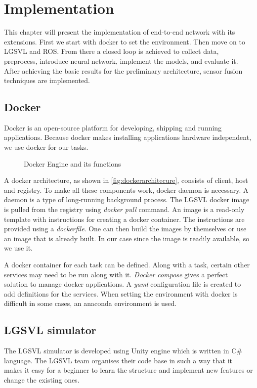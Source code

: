 \chapter{Implementation}
\label{chapter:implementation}
This chapter will present the implementation of end-to-end network with its extensions.
First we start with docker to set the environment. Then move on to LGSVL and ROS.
From there a closed loop is achieved to collect data, preprocess, introduce neural
network, implement the models, and evaluate it. After achieving the basic results for the
preliminary architecture, sensor fusion techniques are implemented.

\section{Docker}
Docker is an open-source platform for developing, shipping and running applications.
Because docker makes installing applications hardware independent, we use docker for our
tasks.
\begin{wrapfigure}{l}{0.5\textwidth}
	\centering
    \def\svgwidth{0.5\textwidth}
    \caption{Docker Engine and its functions}
    \label{fig:dockerengine}
\end{wrapfigure}

A docker architecture, as shown in \ref{fig:dockerarchitecure}, consists of client, host
and registry. To make all these components work, docker daemon is necessary. A daemon is a
type of long-running background process. The LGSVL docker image is pulled from the registry using
\textit{docker pull} command. An image is a read-only template with instructions for
creating a docker container. The instructions are provided using a \textit{dockerfile}.
One can then build the images by themselves or use an image that is already built. In our
case since the image is readily available, so we use it.

A docker container for each task can be defined. Along with a task, certain other
services may need to be run along with it. \textit{Docker compose} gives a perfect
solution to manage docker applications. A \textit{yaml} configuration file is created to
add definitions for the services.  When setting the environment with docker is difficult in some cases, an anaconda
environment \cite{anacondaenv} is used.

\section{LGSVL simulator}
The LGSVL simulator is developed using Unity engine which is written in C\# language.
The LGSVL team organises their code base\cite{lgsvlgithub} in such a way that it makes it
easy for a beginner to learn the structure and implement new features or change the
existing ones.
